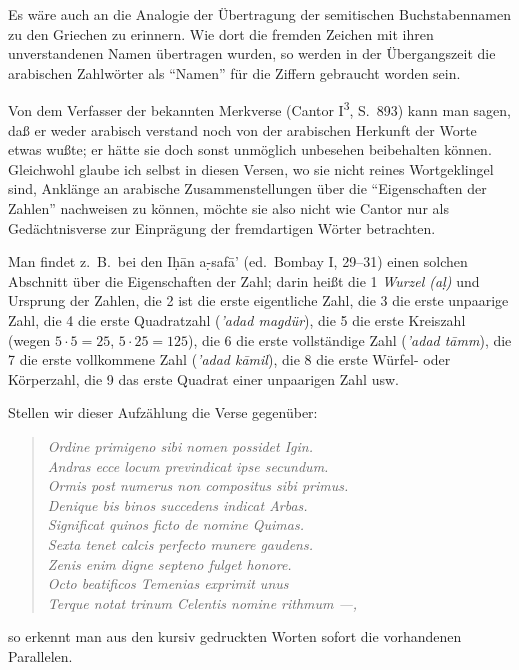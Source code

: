 \documentclass[11pt,a4paper]{article}
\newcommand{\s}[1]{\d{#1}}     %
\newcommand{\hw}{\d{h}}       %
\newcommand{\enquote}[1]{``#1''}
\begin{document}
Es w\"are auch an die Analogie der \"Ubertragung der semitischen Buchstabennamen zu den Griechen zu erinnern. Wie dort die fremden Zeichen mit ihren unverstandenen Namen \"ubertragen wurden, so werden in der \"Ubergangszeit die arabischen Zahlw\"orter als \enquote{Namen} f\"ur die Ziffern gebraucht worden sein.

Von dem Verfasser der bekannten Merkverse (Cantor I\textsuperscript{3}, S.\ 893) kann man sagen, da\ss{} er weder arabisch verstand noch von der arabischen Herkunft der Worte etwas wu\ss{}te; er h\"atte sie doch sonst unm\"oglich unbesehen beibehalten k\"onnen. Gleichwohl glaube ich selbst in diesen Versen, wo sie nicht reines Wortgeklingel sind, Ankl\"ange an arabische Zusammenstellungen \"uber die \enquote{Eigenschaften der Zahlen} nachweisen zu k\"onnen, m\"ochte sie also nicht wie Cantor nur als Ged\"achtnisverse zur Einpr\"agung der fremdartigen W\"orter betrachten.

Man findet z.\ B.\ bei den I\hw{}\=an a\s-s{}af\=a' (ed.\ Bombay I, 29--31) einen solchen Abschnitt \"uber die Eigenschaften der Zahl; darin hei\ss{}t die 1 \textit{Wurzel (a\s{l})} und Ursprung der Zahlen, die 2 ist die erste eigentliche Zahl, die 3 die erste unpaarige Zahl, die 4 die erste Quadratzahl (\textit{'adad ma\d{g}d\"ur}), die 5 die erste Kreiszahl (wegen $5 \cdot 5 = 25$, $5 \cdot 25 = 125$), die 6 die erste vollst\"andige Zahl (\textit{'adad t\=amm}), die 7 die erste vollkommene Zahl (\textit{'adad k\=amil}), die 8 die erste W\"urfel- oder K\"orperzahl, die 9 das erste Quadrat einer unpaarigen Zahl usw.

Stellen wir dieser Aufz\"ahlung die Verse gegen\"uber:
\begin{quote}
\textit{Ordine primigeno sibi nomen possidet Igin.}\\
\textit{Andras ecce locum previndicat ipse secundum.}\\
\textit{Ormis post numerus non compositus sibi primus.}\\
\textit{Denique bis binos succedens indicat Arbas.}\\
\textit{Significat quinos ficto de nomine Quimas.}\\
\textit{Sexta tenet calcis perfecto munere gaudens.}\\
\textit{Zenis enim digne septeno fulget honore.}\\
\textit{Octo beatificos Temenias exprimit unus}\\
\textit{Terque notat trinum Celentis nomine rithmum ---,}
\end{quote}
so erkennt man aus den kursiv gedruckten Worten sofort die vorhandenen Parallelen.
\end{document}
